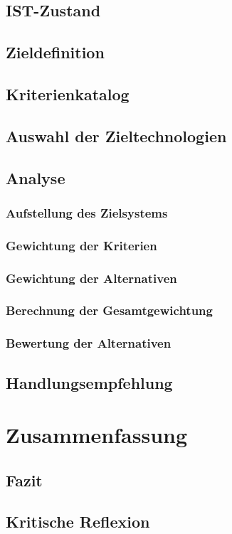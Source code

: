 \section{IST-Zustand}
\section{Zieldefinition}
\section{Kriterienkatalog}
\section{Auswahl der Zieltechnologien}
\section{Analyse}
\subsection{Aufstellung des Zielsystems}
\subsection{Gewichtung der Kriterien}
\subsection{Gewichtung der Alternativen}
\subsection{Berechnung der Gesamtgewichtung}
\subsection{Bewertung der Alternativen}
\section{Handlungsempfehlung}
\chapter{Zusammenfassung}
\section{Fazit} 
\section{Kritische Reflexion}
